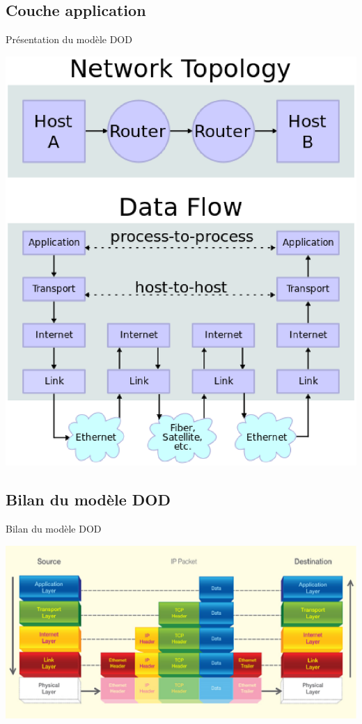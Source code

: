 \begin{frame}\frametitle{}
    \subsection{Couche application}
    {\Huge Présentation du modèle DOD}

    \includegraphics[scale=0.35]{res/DodConnect.eps}

\end{frame}

\begin{frame}\frametitle{}
    \subsection{Bilan du modèle DOD}
    {\Huge Bilan du modèle DOD}

    \includegraphics[scale=0.75]{res/DodExplain.eps}

\end{frame}

